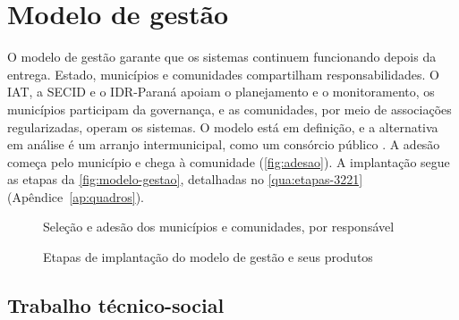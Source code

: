 \section{Modelo de gestão}
\label{subsec:modelos-gestao}

O modelo de gestão garante que os sistemas continuem funcionando depois da
entrega. Estado, municípios e comunidades compartilham responsabilidades. O
IAT, a SECID e o IDR-Paraná apoiam o planejamento e o monitoramento, os
municípios participam da governança, e as comunidades, por meio de associações
regularizadas, operam os sistemas. O modelo está em definição, e a alternativa
em análise é um arranjo intermunicipal, como um consórcio público
\cite{mop2026}. A adesão começa pelo município e chega à comunidade
(\autoref{fig:adesao}). A implantação segue as etapas da
\autoref{fig:modelo-gestao}, detalhadas no \autoref{qua:etapas-3221}
(Apêndice~\ref{ap:quadros}).

\begin{figure}[htbp]
  \centering
  \caption{Seleção e adesão dos municípios e comunidades, por responsável}
  \label{fig:adesao}
\end{figure}

\begin{figure}[htbp]
  \centering
  \caption{Etapas de implantação do modelo de gestão e seus produtos}
  \label{fig:modelo-gestao}
\end{figure}


\subsection{Trabalho técnico-social}
\label{subsec:tts}

